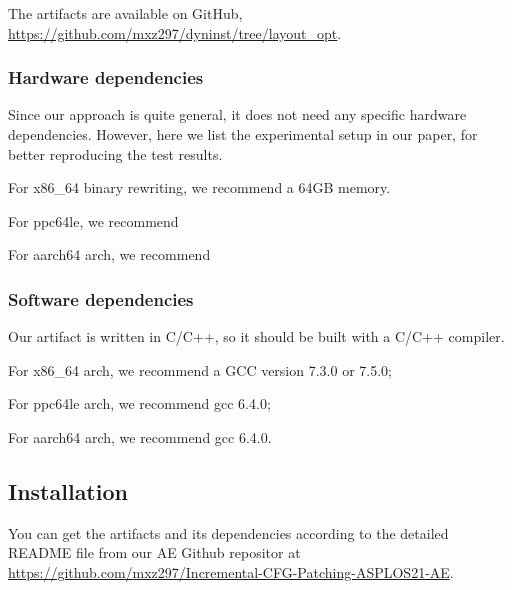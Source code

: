 \documentclass{sigplanconf}
\begin{document}
{The artifacts are available on GitHub, \url{https://github.com/mxz297/dyninst/tree/layout_opt}.


\subsubsection{Hardware dependencies}

Since our approach is quite general, it does not need any specific hardware dependencies. 
However, here we list the experimental setup in our paper, for better reproducing the test results.

For x86\_64 binary rewriting, we recommend a 64GB memory.

For ppc64le, we recommend

For aarch64 arch, we recommend

\subsubsection{Software dependencies}

Our artifact is written in C/C++, so it should be built with a C/C++ compiler.

For x86\_64 arch, we recommend a GCC version 7.3.0 or 7.5.0;

For ppc64le arch, we recommend gcc 6.4.0; 

For aarch64 arch, we recommend gcc 6.4.0.




\subsection{Installation}


You can get the artifacts and its dependencies according to the detailed README file 
from our AE Github repositor at \url{https://github.com/mxz297/Incremental-CFG-Patching-ASPLOS21-AE}.

}
\end{document}
